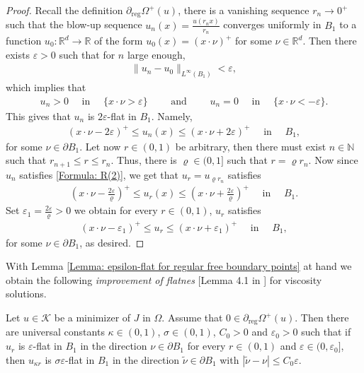 \documentclass[11pt,reqno]{amsart}
\begin{document}
\begin{proof}
	Recall the definition $\partial_{\mathrm{reg}}\varOmega^{+}(u)$, there is a vanishing sequence $r_{n}\to0^{+}$ such that the blow-up sequence $u_{n}(x)=\frac{u(r_{n}x)}{r_{n}}$ converges uniformly in $B_{1}$ to a function $u_{0}\colon\mathbb{R}^{d}\to\mathbb{R}$ of the form $u_{0}(x)=(x\cdot\nu)^{+}$ for some $\nu\in\mathbb{R}^{d}$. Then there exists $\varepsilon>0$ such that for $n$ large enough,
	\begin{align*}
		\|u_{n}-u_{0}\|_{L^{\infty}(B_{1})}<\varepsilon,
	\end{align*}
	which implies that
	\begin{align*}
		u_{n}>0\quad\text{ in }\quad\{x\cdot\nu>\varepsilon\}\qquad\text{ and }\qquad u_{n}=0\quad\text{ in }\quad\{x\cdot\nu<-\varepsilon\}.
	\end{align*}
	This gives that $u_{n}$ is $2\varepsilon$-flat in $B_{1}$. Namely, 
	\begin{align}\label{Formula: R(2)}
		(x\cdot\nu-2\varepsilon)^{+}\leqslant u_{n}(x)\leqslant(x\cdot\nu+2\varepsilon)^{+}\quad\text{ in }\quad B_{1},
	\end{align}
	for some $\nu\in\partial B_{1}$. Let now $r\in(0,1)$ be arbitrary, then there must exist $n\in\mathbb{N}$ such that $r_{n+1}\leqslant r\leqslant r_{n}$. Thus, there is $\varrho\in(0,1]$ such that $r=\varrho r_{n}$. Now since $u_{n}$ satisfies \eqref{Formula: R(2)}, we get that $u_{r}=u_{\varrho r_{n}}$ satisfies
	\begin{align*}
		\left(x\cdot\nu-\frac{2\varepsilon}{\varrho}\right)^{+}\leqslant u_{r}(x)\leqslant\left(x\cdot\nu+\frac{2\varepsilon}{\varrho}\right)^{+}\quad\text{ in }\quad B_{1}.
	\end{align*}
	Set $\varepsilon_{1}=\tfrac{2\varepsilon}{\varrho}>0$ we obtain for every $r\in(0,1)$, $u_{r}$ satisfies
	\begin{align*}
		(x\cdot\nu-\varepsilon_{1})^{+}\leqslant u_{r}\leqslant(x\cdot\nu+\varepsilon_{1})^{+}\quad\text{ in }\quad B_{1},
	\end{align*}
	for some $\nu\in\partial B_{1}$, as desired.
\end{proof}
With Lemma \ref{Lemma: epsilon-flat for regular free boundary points} at hand we obtain the following \emph{improvement of flatnes} [Lemma 4.1 in \cite{S2011}] for viscosity solutions.
\begin{lemma}\label{Lemma: Improvement of flatness}
	Let $u\in\mathcal{K}$ be a minimizer of $J$ in $\Omega$. Assume that $0\in\partial_{\mathrm{reg}}\varOmega^{+}(u)$. Then there are universal constants $\kappa\in(0,1)$, $\sigma\in(0,1)$, $C_{0}>0$ and $\varepsilon_{0}>0$ such that if $u_{r}$ is $\varepsilon$-flat in $B_{1}$ in the direction $\nu\in\partial B_{1}$ for every  $r\in(0,1)$ and $\varepsilon\in(0,\varepsilon_{0}]$, then $u_{\kappa r}$ is $\sigma\varepsilon$-flat in $B_{1}$ in the direction $\tilde{\nu}\in\partial B_{1}$ with $|\tilde{\nu}-\nu|\leqslant C_{0}\varepsilon$.
\end{lemma}
\end{document}
